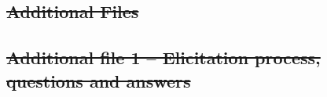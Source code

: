 \documentclass[]{bmcart}
\providecommand{\DIFdeltex}[1]{{\protect\color{red}\sout{#1}}}                      %
\providecommand{\DIFdelbegin}{} %
\providecommand{\DIFdelend}{} %
\providecommand{\DIFdel}[1]{\texorpdfstring{\DIFdeltex{#1}}{}} %
\newcommand{\DIFscaledelfig}{0.5}
\newlength{\DIFdelgraphicswidth} %
\newlength{\DIFdelgraphicsheight} %
\newcommand{\DIFdelincludegraphics}[2][]{%
\sbox{\DIFdelgraphicsbox}{\DIFOincludegraphics[#1]{#2}}%
\settoboxwidth{\DIFdelgraphicswidth}{\DIFdelgraphicsbox} %
\settoboxtotalheight{\DIFdelgraphicsheight}{\DIFdelgraphicsbox} %
\scalebox{\DIFscaledelfig}{%
\parbox[b]{\DIFdelgraphicswidth}{\usebox{\DIFdelgraphicsbox}\\[-\baselineskip] \rule{\DIFdelgraphicswidth}{0em}}\llap{\resizebox{\DIFdelgraphicswidth}{\DIFdelgraphicsheight}{%
\setlength{\unitlength}{\DIFdelgraphicswidth}%
\begin{picture}(1,1)%
\thicklines\linethickness{2pt} %
{\color[rgb]{1,0,0}\put(0,0){\framebox(1,1){}}}%
{\color[rgb]{1,0,0}\put(0,0){\line( 1,1){1}}}%
{\color[rgb]{1,0,0}\put(0,1){\line(1,-1){1}}}%
\end{picture}%
}\hspace*{3pt}}} %
} %
\DeclareRobustCommand{\DIFdelbegin}{\DIFOdelbegin \let\includegraphics\DIFdelincludegraphics} %
\DeclareRobustCommand{\DIFdelend}{\DIFOaddend \let\includegraphics\DIFOincludegraphics} %
\begin{document}
\begin{backmatter}



%



\DIFdelbegin %
\section*{\DIFdel{Additional Files}}
\DIFdelend 

\DIFdelbegin \subsection{\DIFdel{Additional file 1 -- Elicitation process, questions and answers}}
\addtocounter{subsection}{-1}%


\end{backmatter}
\end{document}
